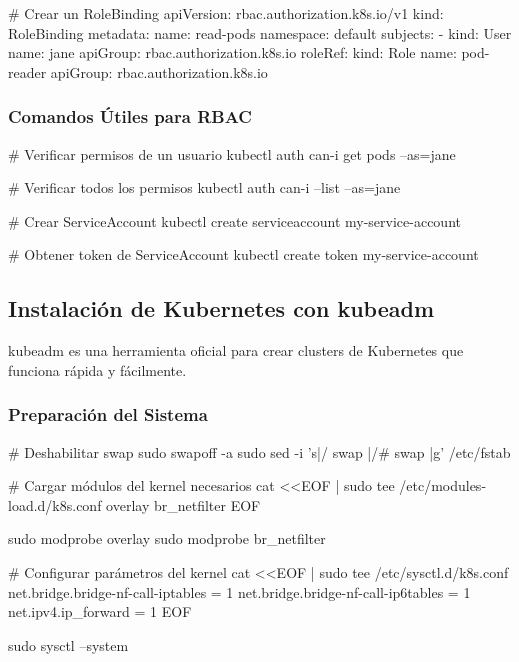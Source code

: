 \documentclass[11pt,a4paper]{article}
\begin{document}
\begin{commandbox}
\# Crear un RoleBinding
apiVersion: rbac.authorization.k8s.io/v1
kind: RoleBinding
metadata:
  name: read-pods
  namespace: default
subjects:
- kind: User
  name: jane
  apiGroup: rbac.authorization.k8s.io
roleRef:
  kind: Role
  name: pod-reader
  apiGroup: rbac.authorization.k8s.io
\end{commandbox}

\subsubsection{Comandos Útiles para RBAC}

\begin{commandbox}
\# Verificar permisos de un usuario
kubectl auth can-i get pods --as=jane

\# Verificar todos los permisos
kubectl auth can-i --list --as=jane

\# Crear ServiceAccount
kubectl create serviceaccount my-service-account

\# Obtener token de ServiceAccount
kubectl create token my-service-account
\end{commandbox}

\subsection{Instalación de Kubernetes con kubeadm}

kubeadm es una herramienta oficial para crear clusters de Kubernetes que funciona rápida y fácilmente.

\subsubsection{Preparación del Sistema}

\begin{commandbox}
\# Deshabilitar swap
sudo swapoff -a
sudo sed -i 's|/ swap |/# swap |g' /etc/fstab

\# Cargar módulos del kernel necesarios
cat <<EOF | sudo tee /etc/modules-load.d/k8s.conf
overlay
br\_netfilter
EOF

sudo modprobe overlay
sudo modprobe br\_netfilter

\# Configurar parámetros del kernel
cat <<EOF | sudo tee /etc/sysctl.d/k8s.conf
net.bridge.bridge-nf-call-iptables  = 1
net.bridge.bridge-nf-call-ip6tables = 1
net.ipv4.ip\_forward                 = 1
EOF

sudo sysctl --system
\end{commandbox}
\end{document}
